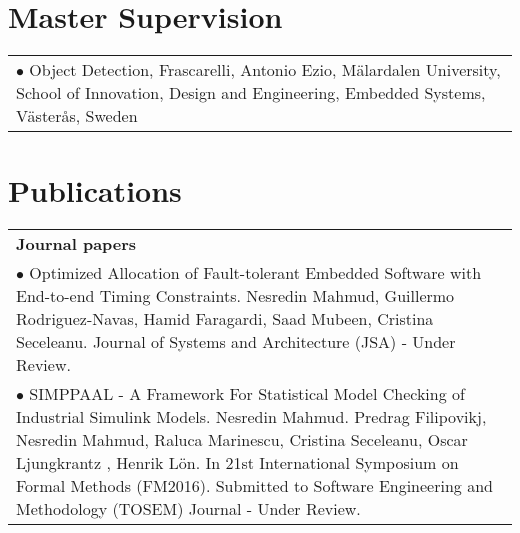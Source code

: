 \documentclass[11pt,a4paper,sans]{moderncv} %
\begin{document}
\section{Master Supervision}
\begin{tabular}{@{}p{1\linewidth}@{}}
$\bullet$ Object Detection, Frascarelli, Antonio Ezio, M{\"a}lardalen University, School of Innovation, Design and Engineering, Embedded Systems, V{\"a}ster{\aa}s, Sweden\\[6pt]
\end{tabular}

\section{Publications}
\begin{tabular}{@{}p{1\linewidth}@{}}
\textbf{Journal papers}\\[6pt]
$\bullet$ Optimized Allocation of Fault-tolerant Embedded Software with End-to-end Timing Constraints. Nesredin Mahmud, Guillermo Rodriguez-Navas, Hamid Faragardi, Saad Mubeen, Cristina Seceleanu. Journal of Systems and Architecture (JSA) - Under Review.\\[6pt]

$\bullet$ SIMPPAAL - A Framework For Statistical Model Checking of Industrial Simulink Models. Nesredin Mahmud. Predrag Filipovikj, Nesredin Mahmud, Raluca Marinescu, Cristina Seceleanu, Oscar Ljungkrantz , Henrik Lön. In 21st International Symposium on Formal Methods (FM2016). Submitted to Software Engineering and Methodology (TOSEM) Journal - Under Review.\\[6pt]
\end{tabular}
\end{document}
